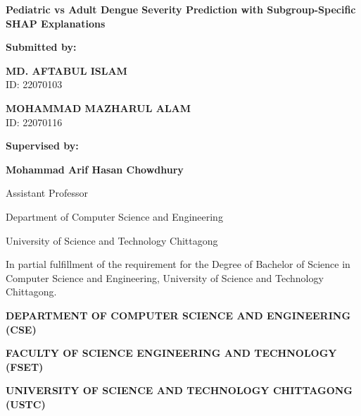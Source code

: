 \documentclass[12pt, a4paper]{report}
\begin{document}
\begin{titlepage}
    \centering
    \vspace*{1.5cm}
    
    {\Large \textbf{Pediatric vs Adult Dengue Severity Prediction with Subgroup-Specific SHAP Explanations}\par}
    \vspace{1.5cm}
    
    {\large \textbf{Submitted by:}\par}
    \vspace{0.3cm}
    {\large \textbf{MD. AFTABUL ISLAM} \\ ID: 22070103 \par}
    \vspace{0.2cm}
    {\large \textbf{MOHAMMAD MAZHARUL ALAM} \\ ID: 22070116 \par}
    
    \vspace{1.5cm}
    {\large \textbf{Supervised by:}\par}
    \vspace{0.3cm}
    {\large \textbf{Mohammad Arif Hasan Chowdhury}\par}
    {\large Assistant Professor\par}
    {\large Department of Computer Science and Engineering\par}
    {\large University of Science and Technology Chittagong\par}
    
    \vfill
    {\large In partial fulfillment of the requirement for the Degree of Bachelor of Science in Computer Science and Engineering, University of Science and Technology Chittagong.\par}
    \vspace{1cm}
    {\large \textbf{DEPARTMENT OF COMPUTER SCIENCE AND ENGINEERING (CSE)}\par}
    {\large \textbf{FACULTY OF SCIENCE ENGINEERING AND TECHNOLOGY (FSET)}\par}
    {\large \textbf{UNIVERSITY OF SCIENCE AND TECHNOLOGY CHITTAGONG (USTC)}\par}
\end{titlepage}
\end{document}
